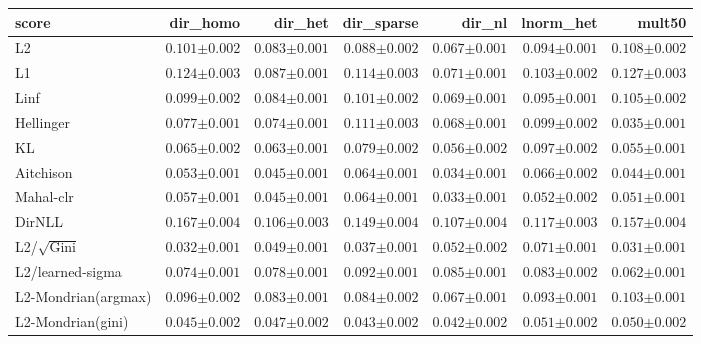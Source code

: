 \begin{tabular}{lrrrrrr}
\toprule
score & dir\_homo & dir\_het & dir\_sparse & dir\_nl & lnorm\_het & mult50 \\
\midrule
L2 & $0.101{\scriptstyle\pm0.002}$ & $0.083{\scriptstyle\pm0.001}$ & $0.088{\scriptstyle\pm0.002}$ & $0.067{\scriptstyle\pm0.001}$ & $0.094{\scriptstyle\pm0.001}$ & $0.108{\scriptstyle\pm0.002}$ \\
L1 & $0.124{\scriptstyle\pm0.003}$ & $0.087{\scriptstyle\pm0.001}$ & $0.114{\scriptstyle\pm0.003}$ & $0.071{\scriptstyle\pm0.001}$ & $0.103{\scriptstyle\pm0.002}$ & $0.127{\scriptstyle\pm0.003}$ \\
Linf & $0.099{\scriptstyle\pm0.002}$ & $0.084{\scriptstyle\pm0.001}$ & $0.101{\scriptstyle\pm0.002}$ & $0.069{\scriptstyle\pm0.001}$ & $0.095{\scriptstyle\pm0.001}$ & $0.105{\scriptstyle\pm0.002}$ \\
Hellinger & $0.077{\scriptstyle\pm0.001}$ & $0.074{\scriptstyle\pm0.001}$ & $0.111{\scriptstyle\pm0.003}$ & $0.068{\scriptstyle\pm0.001}$ & $0.099{\scriptstyle\pm0.002}$ & $0.035{\scriptstyle\pm0.001}$ \\
KL & $0.065{\scriptstyle\pm0.002}$ & $0.063{\scriptstyle\pm0.001}$ & $0.079{\scriptstyle\pm0.002}$ & $0.056{\scriptstyle\pm0.002}$ & $0.097{\scriptstyle\pm0.002}$ & $0.055{\scriptstyle\pm0.001}$ \\
Aitchison & $0.053{\scriptstyle\pm0.001}$ & $0.045{\scriptstyle\pm0.001}$ & $0.064{\scriptstyle\pm0.001}$ & $0.034{\scriptstyle\pm0.001}$ & $0.066{\scriptstyle\pm0.002}$ & $0.044{\scriptstyle\pm0.001}$ \\
Mahal-clr & $0.057{\scriptstyle\pm0.001}$ & $\mathbf{0.045}{\scriptstyle\pm0.001}$ & $0.064{\scriptstyle\pm0.001}$ & $\mathbf{0.033}{\scriptstyle\pm0.001}$ & $0.052{\scriptstyle\pm0.002}$ & $0.051{\scriptstyle\pm0.001}$ \\
DirNLL & $0.167{\scriptstyle\pm0.004}$ & $0.106{\scriptstyle\pm0.003}$ & $0.149{\scriptstyle\pm0.004}$ & $0.107{\scriptstyle\pm0.004}$ & $0.117{\scriptstyle\pm0.003}$ & $0.157{\scriptstyle\pm0.004}$ \\
L2/$\sqrt{\mathrm{Gini}}$ & $\mathbf{0.032}{\scriptstyle\pm0.001}$ & $0.049{\scriptstyle\pm0.001}$ & $\mathbf{0.037}{\scriptstyle\pm0.001}$ & $0.052{\scriptstyle\pm0.002}$ & $0.071{\scriptstyle\pm0.001}$ & $\mathbf{0.031}{\scriptstyle\pm0.001}$ \\
L2/learned-sigma & $0.074{\scriptstyle\pm0.001}$ & $0.078{\scriptstyle\pm0.001}$ & $0.092{\scriptstyle\pm0.001}$ & $0.085{\scriptstyle\pm0.001}$ & $0.083{\scriptstyle\pm0.002}$ & $0.062{\scriptstyle\pm0.001}$ \\
L2-Mondrian(argmax) & $0.096{\scriptstyle\pm0.002}$ & $0.083{\scriptstyle\pm0.001}$ & $0.084{\scriptstyle\pm0.002}$ & $0.067{\scriptstyle\pm0.001}$ & $0.093{\scriptstyle\pm0.001}$ & $0.103{\scriptstyle\pm0.001}$ \\
L2-Mondrian(gini) & $0.045{\scriptstyle\pm0.002}$ & $0.047{\scriptstyle\pm0.002}$ & $0.043{\scriptstyle\pm0.002}$ & $0.042{\scriptstyle\pm0.002}$ & $\mathbf{0.051}{\scriptstyle\pm0.002}$ & $0.050{\scriptstyle\pm0.002}$ \\
\bottomrule
\end{tabular}